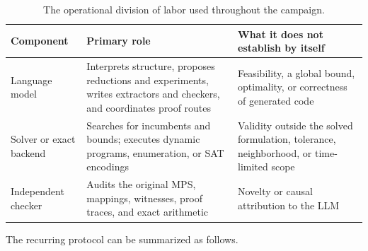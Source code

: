 \documentclass[11pt,letterpaper]{article}
\renewcommand{\arraystretch}{1.22}
\newcommand{\tighttable}{\small\setlength{\tabcolsep}{5pt}\renewcommand{\arraystretch}{1.18}}
\begin{document}
\begin{table}[htbp]
\centering
\tighttable
{}
\begin{tabularx}{\textwidth}{>{\raggedright\arraybackslash}p{}>{\raggedright\arraybackslash}p{}>{\raggedright\arraybackslash}X}
\toprule
\textbf{Component} & \textbf{Primary role} & \textbf{What it does not establish by itself} \\
\midrule
Language model & Interprets structure, proposes reductions and experiments, writes extractors and checkers, and coordinates proof routes & Feasibility, a global bound, optimality, or correctness of generated code \\
Solver or exact backend & Searches for incumbents and bounds; executes dynamic programs, enumeration, or SAT encodings & Validity outside the solved formulation, tolerance, neighborhood, or time-limited scope \\
Independent checker & Audits the original MPS, mappings, witnesses, proof traces, and exact arithmetic & Novelty or causal attribution to the LLM \\
\bottomrule
\end{tabularx}
\caption{The operational division of labor used throughout the campaign.}
\label{tab:division-of-labor}
\end{table}

The recurring protocol can be summarized as follows.
\end{document}
